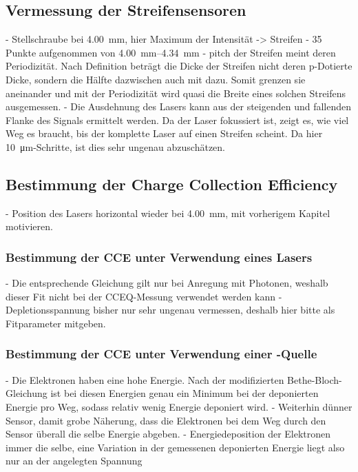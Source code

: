 \subsection{Vermessung der Streifensensoren}
\label{sec:Vermessung-Auswertung}

- Stellschraube bei \SI{4.00}{\milli\meter}, hier Maximum der Intensität -> Streifen
- 35 Punkte aufgenommen von \SIrange{4.00}{4.34}{\milli\meter}
- pitch der Streifen meint deren Periodizität. Nach Definition beträgt die Dicke der
Streifen nicht deren p-Dotierte Dicke, sondern die Hälfte dazwischen auch mit dazu.
Somit grenzen sie aneinander und mit der Periodizität wird quasi die Breite eines
solchen Streifens ausgemessen.
- Die Ausdehnung des Lasers kann aus der steigenden und fallenden Flanke des Signals
ermittelt werden. Da der Laser fokussiert ist, zeigt es, wie viel Weg es braucht,
bis der komplette Laser auf einen Streifen scheint. Da hier \SI{10}{\micro\meter}-Schritte,
ist dies sehr ungenau abzuschätzen.

\subsection{Bestimmung der Charge Collection Efficiency}
\label{sec:CCE-Auswertung}

- Position des Lasers horizontal wieder bei \SI{4.00}{\milli\meter}, mit vorherigem
Kapitel motivieren.

\subsubsection{Bestimmung der CCE unter Verwendung eines Lasers}
\label{sec:CCEL-Auswertung}

- Die entsprechende Gleichung gilt nur bei Anregung mit Photonen, weshalb dieser Fit
nicht bei der CCEQ-Messung verwendet werden kann
- Depletionsspannung bisher nur sehr ungenau vermessen, deshalb hier bitte als
Fitparameter mitgeben.

\subsubsection{Bestimmung der CCE unter Verwendung einer \texorpdfstring{}{Sr}-Quelle}
\label{sec:CCEQ-Auswertung}

- Die Elektronen haben eine hohe Energie. Nach der modifizierten Bethe-Bloch-Gleichung
ist bei diesen Energien genau ein Minimum bei der deponierten Energie pro Weg, sodass
relativ wenig Energie deponiert wird.
- Weiterhin dünner Sensor, damit grobe Näherung, dass die Elektronen bei dem Weg durch
den Sensor überall die selbe Energie abgeben.
- Energiedeposition der Elektronen immer die selbe, eine Variation in der gemessenen
deponierten Energie liegt also nur an der angelegten Spannung

